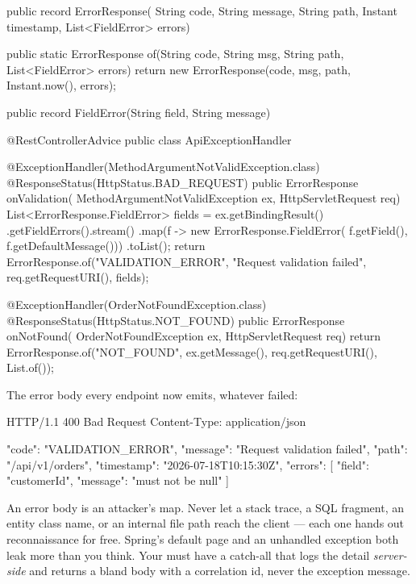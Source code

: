 \begin{javabox}
public record ErrorResponse(
    String code, String message, String path,
    Instant timestamp, List<FieldError> errors) {

  public static ErrorResponse of(String code, String msg,
      String path, List<FieldError> errors) {
    return new ErrorResponse(code, msg, path, Instant.now(), errors);
  }

  public record FieldError(String field, String message) {}
}
\end{javabox}

\begin{javabox}
@RestControllerAdvice
public class ApiExceptionHandler {

  @ExceptionHandler(MethodArgumentNotValidException.class)
  @ResponseStatus(HttpStatus.BAD_REQUEST)
  public ErrorResponse onValidation(
      MethodArgumentNotValidException ex, HttpServletRequest req) {
    List<ErrorResponse.FieldError> fields = ex.getBindingResult()
        .getFieldErrors().stream()
        .map(f -> new ErrorResponse.FieldError(
            f.getField(), f.getDefaultMessage()))
        .toList();
    return ErrorResponse.of("VALIDATION_ERROR",
        "Request validation failed", req.getRequestURI(), fields);
  }

  @ExceptionHandler(OrderNotFoundException.class)
  @ResponseStatus(HttpStatus.NOT_FOUND)
  public ErrorResponse onNotFound(
      OrderNotFoundException ex, HttpServletRequest req) {
    return ErrorResponse.of("NOT_FOUND", ex.getMessage(),
        req.getRequestURI(), List.of());
  }
}
\end{javabox}

The error body every endpoint now emits, whatever failed:

\begin{httpbox}
HTTP/1.1 400 Bad Request
Content-Type: application/json

{
  "code": "VALIDATION_ERROR",
  "message": "Request validation failed",
  "path": "/api/v1/orders",
  "timestamp": "2026-07-18T10:15:30Z",
  "errors": [
    { "field": "customerId", "message": "must not be null" }
  ]
}
\end{httpbox}

\begin{secwarn}
An error body is an attacker's map. Never let a stack trace, a SQL fragment, an entity class name, or an internal file path reach the client --- each one hands out reconnaissance for free. Spring's default  page and an unhandled exception both leak more than you think. Your  must have a catch-all  that logs the detail \emph{server-side} and returns a bland  body with a correlation id, never the exception message.
\end{secwarn}

